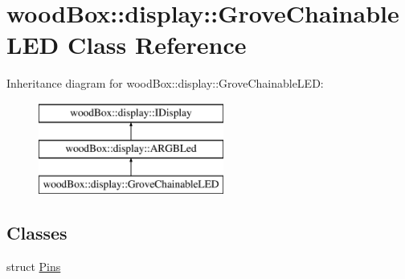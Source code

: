 \hypertarget{classwood_box_1_1display_1_1_grove_chainable_l_e_d}{}\section{wood\+Box\+:\+:display\+:\+:Grove\+Chainable\+L\+ED Class Reference}
\label{classwood_box_1_1display_1_1_grove_chainable_l_e_d}
Inheritance diagram for wood\+Box\+:\+:display\+:\+:Grove\+Chainable\+L\+ED\+:\begin{figure}[H]
\begin{center}
\leavevmode
\includegraphics[height=3.000000cm]{classwood_box_1_1display_1_1_grove_chainable_l_e_d}
\end{center}
\end{figure}
\subsection*{Classes}
\begin{DoxyCompactItemize}
\item 
struct \mbox{\hyperlink{structwood_box_1_1display_1_1_grove_chainable_l_e_d_1_1_pins}{Pins}}
\end{DoxyCompactItemize}
